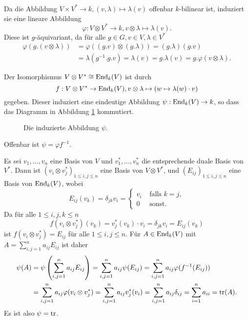 \documentclass[a4paper,10pt]{article}
\begin{document}
\subsubsection{}
Da die Abbildung $V \times V^* \to k, (v,\lambda) \mapsto \lambda(v)$ offenbar $k$-bilinear ist, induziert sie eine lineare Abbildung
\[
 \varphi : V \otimes V^* \to k, v \otimes \lambda \mapsto \lambda(v).
\]
Diese ist $g$-äquivariant, da für alle $g \in G, v \in V, \lambda \in V^*$
\begin{align*}
 \varphi(g.(v \otimes \lambda))
 &= \varphi((g.v) \otimes (g.\lambda))
 = (g.\lambda)(g.v) \\
 &= \lambda(g^{-1}.g.v) 
 = \lambda(v)
 = g.\lambda(v)
 = g.\varphi(v \otimes \lambda).
\end{align*}

Der Isomorphismus $V \otimes V^* \cong \operatorname{End}_k(V)$ ist durch
\[
 f: V \otimes V^* \to \operatorname{End}_k(V), v \otimes \lambda \mapsto (w \mapsto \lambda(w) \cdot v)
\]
gegeben. Dieser induziert eine eindeutige Abbildung $\psi : \operatorname{End}_k(V) \to k$, so dass das Diagramm in Abbildung \ref{fig: induziert} kommutiert.
\begin{figure}\centering
 \caption{Die induzierte Abbildung $\psi$.}
 \label{fig: induziert}
\end{figure}
Offenbar ist $\psi = \varphi f^{-1}$.

Es sei $v_1, \ldots, v_n$ eine Basis von $V$ und $v_1^*, \ldots, v_n^*$ die entsprechende duale Basis von $V^*$. Dann ist $(v_i \otimes v_j^*)_{1 \leq i,j \leq n}$ eine Basis von $V \otimes V^*$, und $(E_{ij})_{1 \leq i,j \leq n}$ eine Basis von $\operatorname{End}_k(V)$, wobei
\[
 E_{ij}(v_k) = \delta_{jk} v_i =
 \begin{cases}
  v_i & \text{ falls } k=j, \\
    0 & \text{ sonst}.
 \end{cases}
\]
Da für alle $1 \leq i,j,k \leq n$
\[
 f(v_i \otimes v_j^*)(v_k)
 = v_j^*(v_k)\cdot v_i
 = \delta_{jk} v_i
 = E_{ij}(v_k)
\]
ist $f(v_i \otimes v_j^*) = E_{ij}$ für alle $1 \leq i,j \leq n$. Für $A \in \operatorname{End}_k(V)$ mit $A = \sum_{i,j=1}^n a_{ij} E_{ij}$ ist daher
\begin{align*}
 \psi(A)
 &= \psi\left( \sum_{i,j=1}^n a_{ij} E_{ij} \right)
 = \sum_{i,j=1}^n a_{ij} \psi(E_{ij})
 = \sum_{i,j=1}^n a_{ij} \varphi(f^{-1}(E_{ij})) \\
 &= \sum_{i,j=1}^n a_{ij} \varphi(v_i \otimes v_j^*)
 = \sum_{i,j=1}^n a_{ij} v_j^*(v_i)
 = \sum_{i,j=1}^n a_{ij} \delta_{ij}
 = \sum_{i=1}^n a_{ii}
 = \operatorname{tr}(A).
\end{align*}
Es ist also $\psi = \operatorname{tr}$.
\end{document}
